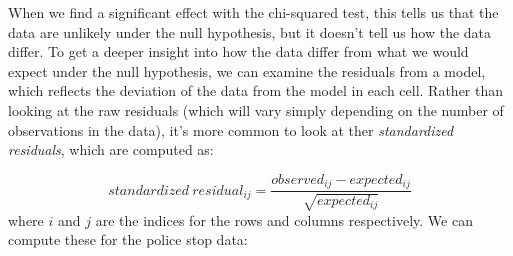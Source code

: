 \documentclass[]{book}
\newenvironment{Shaded}{\begin{snugshade}}{\end{snugshade}}
\newcommand{\KeywordTok}[1]{\textcolor[rgb]{0.13,0.29,0.53}{\textbf{#1}}}
\newcommand{\DataTypeTok}[1]{\textcolor[rgb]{0.13,0.29,0.53}{#1}}
\newcommand{\StringTok}[1]{\textcolor[rgb]{0.31,0.60,0.02}{#1}}
\newcommand{\CommentTok}[1]{\textcolor[rgb]{0.56,0.35,0.01}{\textit{#1}}}
\newcommand{\OperatorTok}[1]{\textcolor[rgb]{0.81,0.36,0.00}{\textbf{#1}}}
\newcommand{\NormalTok}[1]{#1}
\theoremstyle{definition}
\theoremstyle{definition}
\theoremstyle{definition}
\theoremstyle{remark}
\begin{document}
When we find a significant effect with the chi-squared test, this tells
us that the data are unlikely under the null hypothesis, but it doesn't
tell us how the data differ. To get a deeper insight into how the data
differ from what we would expect under the null hypothesis, we can
examine the residuals from a model, which reflects the deviation of the
data from the model in each cell. Rather than looking at the raw
residuals (which will vary simply depending on the number of
observations in the data), it's more common to look at ther
\emph{standardized residuals}, which are computed as:

\[
standardized\ residual_{ij} = \frac{observed_{ij} - expected_{ij}}{\sqrt{expected_{ij}}}
\] where \(i\) and \(j\) are the indices for the rows and columns
respectively. We can compute these for the police stop data:

\begin{Shaded}
\end{Shaded}
\end{document}

